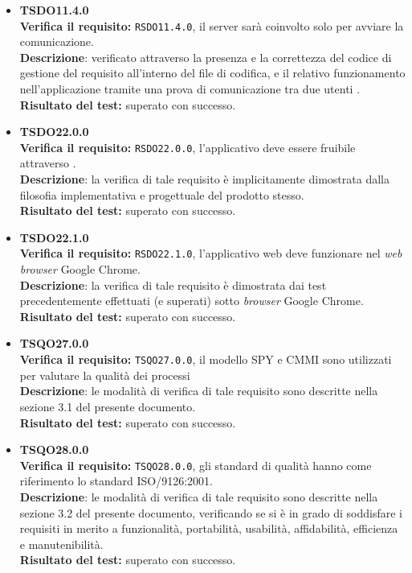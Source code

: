 \begin{itemize}
\item \textbf{TSDO11.4.0}\\
\textbf{Verifica il requisito:} \texttt{RSDO11.4.0}, il server sarà coinvolto solo per avviare la comunicazione.\\
\textbf{Descrizione}: verificato attraverso la presenza e la correttezza del codice di gestione del requisito all'interno del file di codifica, e il relativo funzionamento nell'applicazione tramite una prova di comunicazione tra due utenti .\\
\textbf{Risultato del test:} superato con successo.

\item \textbf{TSDO22.0.0}\\
\textbf{Verifica il requisito:} \texttt{RSDO22.0.0}, l'applicativo deve essere fruibile attraverso .\\
\textbf{Descrizione}: la verifica di tale requisito è implicitamente dimostrata dalla filosofia implementativa e progettuale del prodotto stesso.\\
\textbf{Risultato del test:} superato con successo.

\item \textbf{TSDO22.1.0}\\
\textbf{Verifica il requisito:} \texttt{RSDO22.1.0}, l'applicativo web deve funzionare nel \textit{web browser} Google Chrome.\\
\textbf{Descrizione}: la verifica di tale requisito è dimostrata dai test precedentemente effettuati (e superati) sotto \textit{browser} Google Chrome.
\textbf{Risultato del test:} superato con successo.

\item \textbf{TSQO27.0.0}\\
\textbf{Verifica il requisito:} \texttt{TSQO27.0.0}, il modello SPY e CMMI sono utilizzati per valutare la qualità dei processi\\
\textbf{Descrizione}: le modalità di verifica di tale requisito sono descritte nella sezione 3.1 del presente documento.\\
\textbf{Risultato del test:} superato con successo.

\item \textbf{TSQO28.0.0}\\
\textbf{Verifica il requisito:} \texttt{TSQO28.0.0}, gli standard di qualità hanno come riferimento lo standard ISO/9126:2001.\\
\textbf{Descrizione}: le modalità di verifica di tale requisito sono descritte nella sezione 3.2 del presente documento, verificando se si è in grado di soddisfare i requisiti in merito a funzionalità, portabilità, usabilità, affidabilità, efficienza e manutenibilità.\\
\textbf{Risultato del test:} superato con successo.


\end{itemize}
